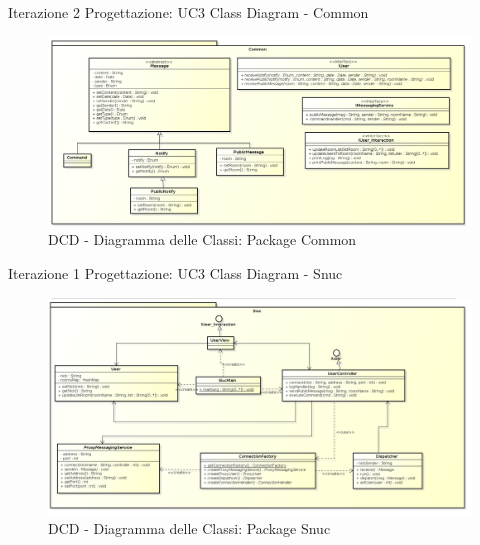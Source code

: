 \documentclass[t]{beamer} %
\begin{document}
\begin{frame} {Iterazione 2 Progettazione: UC3 Class Diagram - Common}
   \begin{figure}
     \includegraphics[scale=0.245]{image_astah/Iteration_2_DesignModel/ClassDiagramCommon.png}{\centering}
     \caption{DCD - Diagramma delle Classi: Package Common }
     \label{fig_UC3_DCD_1} 
   \end{figure}
\end{frame}

\begin{frame} {Iterazione 1 Progettazione: UC3 Class Diagram - Snuc}
   \begin{figure}
     \includegraphics[scale=0.24]{image_astah/Iteration_2_DesignModel/ClassDiagramSnuc.png}{\centering}
     \caption{DCD - Diagramma delle Classi: Package Snuc }
     \label{fig_UC3_DCD_3} 
   \end{figure}
\end{frame}
\end{document}
